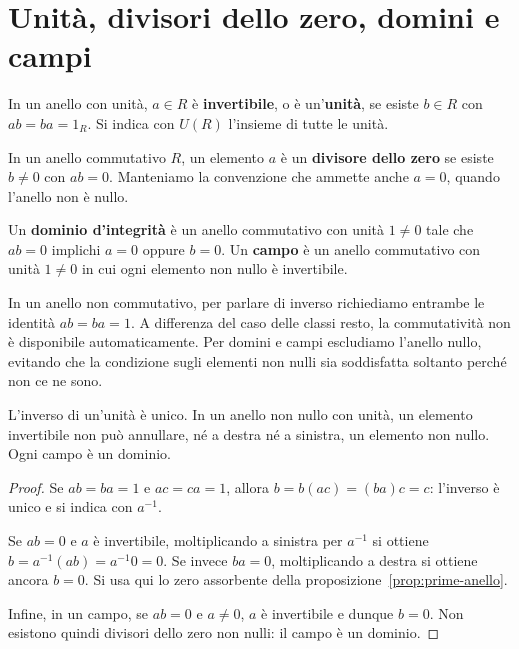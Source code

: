 \section{Unità, divisori dello zero, domini e campi}
\begin{definizione}
In un anello con unità, $a\in R$ è \textbf{invertibile}, o è un'\textbf{unità}, se esiste $b\in R$ con $ab=ba=1_R$. Si indica con $U(R)$ l'insieme di tutte le unità.

In un anello commutativo $R$, un elemento $a$ è un \textbf{divisore dello zero} se esiste $b\ne0$ con $ab=0$. Manteniamo la convenzione che ammette anche $a=0$, quando l'anello non è nullo.

Un \textbf{dominio d'integrità} è un anello commutativo con unità $1\ne0$ tale che $ab=0$ implichi $a=0$ oppure $b=0$. Un \textbf{campo} è un anello commutativo con unità $1\ne0$ in cui ogni elemento non nullo è invertibile.
\end{definizione}

\begin{osservazione}
In un anello non commutativo, per parlare di inverso richiediamo entrambe le identità $ab=ba=1$. A differenza del caso delle classi resto, la commutatività non è disponibile automaticamente. Per domini e campi escludiamo l'anello nullo, evitando che la condizione sugli elementi non nulli sia soddisfatta soltanto perché non ce ne sono.
\end{osservazione}

\begin{proposizione}
L'inverso di un'unità è unico. In un anello non nullo con unità, un elemento invertibile non può annullare, né a destra né a sinistra, un elemento non nullo. Ogni campo è un dominio.
\end{proposizione}
\begin{proof}
Se $ab=ba=1$ e $ac=ca=1$, allora $b=b(ac)=(ba)c=c$: l'inverso è unico e si indica con $a^{-1}$.

Se $ab=0$ e $a$ è invertibile, moltiplicando a sinistra per $a^{-1}$ si ottiene $b=a^{-1}(ab)=a^{-1}0=0$. Se invece $ba=0$, moltiplicando a destra si ottiene ancora $b=0$. Si usa qui lo zero assorbente della proposizione~\ref{prop:prime-anello}.

Infine, in un campo, se $ab=0$ e $a\ne0$, $a$ è invertibile e dunque $b=0$. Non esistono quindi divisori dello zero non nulli: il campo è un dominio.
\end{proof}

